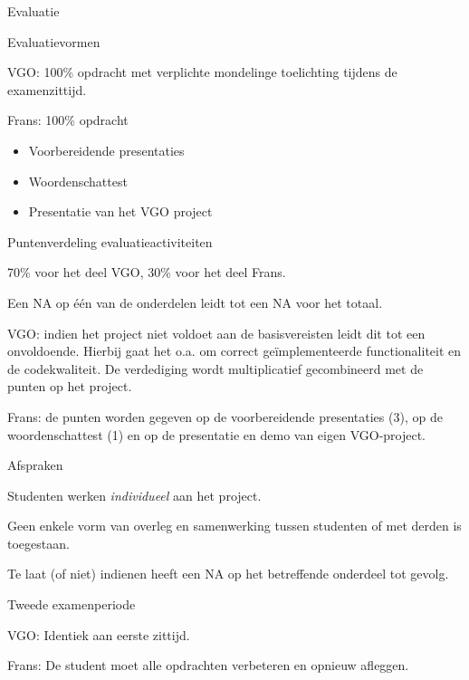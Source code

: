\documentclass{studiewijzer}
\begin{document}
\begin{categorybox}{Evaluatie}
    \begin{category}{Evaluatievormen}
        \begin{items}
            \item VGO: 100\% opdracht met verplichte mondelinge toelichting tijdens de examenzittijd.
            \item Frans: 100\% opdracht
                    \begin{itemize}
                    \item Voorbereidende presentaties
                    \item Woordenschattest
                    \item Presentatie van het VGO project
                    \end{itemize}
        \end{items}
    \end{category}
    \categoryseparator
    \begin{category}{Puntenverdeling evaluatieactiviteiten}
        \begin{items}
            \item 70\% voor het deel VGO, 30\% voor het deel Frans.
            \item Een NA op \'e\'en van de onderdelen leidt tot een NA voor het totaal.
            \item VGO: indien het project niet voldoet aan de basisvereisten leidt dit tot een onvoldoende.
                    Hierbij gaat het o.a. om correct ge\"implementeerde functionaliteit en de codekwaliteit.
                    De verdediging wordt multiplicatief gecombineerd met de punten op het project.
            \item Frans: de punten worden gegeven op de voorbereidende
                    presentaties (3), op de woordenschattest (1) en op de presentatie
                    en demo van eigen VGO-project.
        \end{items}
    \end{category}
    \categoryseparator
    \begin{category}{Afspraken}
        \begin{items}
            \item Studenten werken \emph{individueel} aan het project.
            \item Geen enkele vorm van overleg en samenwerking tussen studenten of met derden is toegestaan.
            \item Te laat (of niet) indienen heeft een NA op het betreffende onderdeel tot gevolg.
        \end{items}
    \end{category}
    \categoryseparator
    \begin{category}{Tweede examenperiode}
        \begin{items}
            \item VGO: Identiek aan eerste zittijd.
            \item Frans: De student moet alle opdrachten verbeteren en opnieuw afleggen.
        \end{items}
    \end{category}
\end{categorybox}
\end{document}
